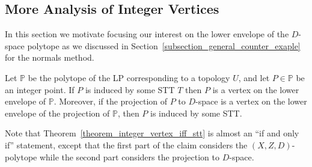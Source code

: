 \subsection{More Analysis of Integer Vertices}
\label{subscetion_note_on_STT_as_vertices}
In this section we motivate focusing our interest on the lower envelope of the $D$-space polytope as we discussed in Section~\ref{subsection_general_counter_exaple} for the normals method.

\begin{theorem}
\label{theorem_integer_vertex_iff_stt}
Let $\mathbb{P}$ be the polytope of the LP corresponding to a topology $U$, and let $P \in \mathbb{P}$ be an integer point. If $P$ is induced by some STT $T$ then $P$ is a vertex on the lower envelope of $\mathbb{P}$. Moreover, if the projection of $P$ to $D$-space is a vertex on the lower envelope of the projection of $\mathbb{P}$, then $P$ is induced by some STT.
\end{theorem}

Note that Theorem~\ref{theorem_integer_vertex_iff_stt} is almost an ``if and only if'' statement, except that the first part of the claim considers the $(X,Z,D)$-polytope while the second part considers the projection to $D$-space.


